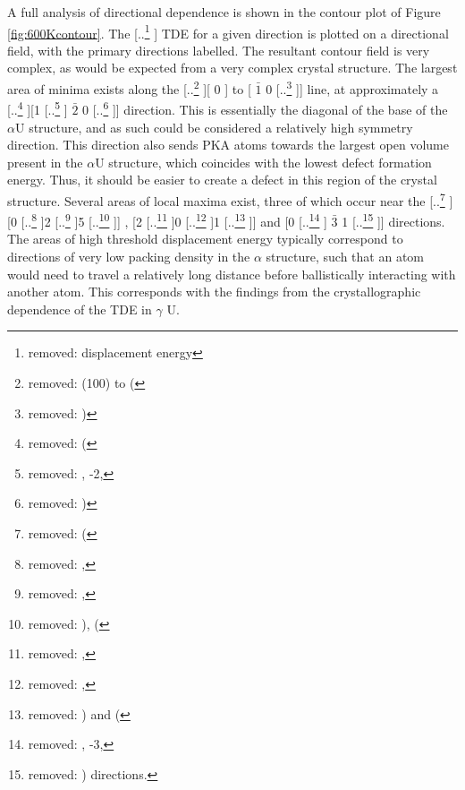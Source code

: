 \documentclass[review]{elsarticle}
\providecommand{\DIFaddtex}[1]{{\protect\color{blue} \sf #1}} %
\providecommand{\DIFdeltex}[1]{{\protect\color{red} [..\footnote{removed: #1} ]}} %
\providecommand{\DIFaddbegin}{} %
\providecommand{\DIFaddend}{} %
\providecommand{\DIFdelbegin}{} %
\providecommand{\DIFdelend}{} %
\providecommand{\DIFadd}[1]{\texorpdfstring{\DIFaddtex{#1}}{#1}} %
\providecommand{\DIFdel}[1]{\texorpdfstring{\DIFdeltex{#1}}{}} %
\newcommand{\DIFscaledelfig}{0.5}
\newlength{\DIFdelgraphicswidth} %
\newlength{\DIFdelgraphicsheight} %
\newcommand{\DIFaddincludegraphics}[2][]{{\color{blue}\fbox{\DIFOincludegraphics[#1]{#2}}}} %
\newcommand{\DIFdelincludegraphics}[2][]{%
\sbox{\DIFdelgraphicsbox}{\DIFOincludegraphics[#1]{#2}}%
\settoboxwidth{\DIFdelgraphicswidth}{\DIFdelgraphicsbox} %
\settoboxtotalheight{\DIFdelgraphicsheight}{\DIFdelgraphicsbox} %
\scalebox{\DIFscaledelfig}{%
\parbox[b]{\DIFdelgraphicswidth}{\usebox{\DIFdelgraphicsbox}\\[-\baselineskip] \rule{\DIFdelgraphicswidth}{0em}}\llap{\resizebox{\DIFdelgraphicswidth}{\DIFdelgraphicsheight}{%
\setlength{\unitlength}{\DIFdelgraphicswidth}%
\begin{picture}(1,1)%
\thicklines\linethickness{2pt} %
{\color[rgb]{1,0,0}\put(0,0){\framebox(1,1){}}}%
{\color[rgb]{1,0,0}\put(0,0){\line( 1,1){1}}}%
{\color[rgb]{1,0,0}\put(0,1){\line(1,-1){1}}}%
\end{picture}%
}\hspace*{3pt}}} %
} %
\DeclareRobustCommand{\DIFaddbegin}{\DIFOaddbegin \let\includegraphics\DIFaddincludegraphics} %
\DeclareRobustCommand{\DIFaddend}{\DIFOaddend \let\includegraphics\DIFOincludegraphics} %
\DeclareRobustCommand{\DIFdelbegin}{\DIFOdelbegin \let\includegraphics\DIFdelincludegraphics} %
\DeclareRobustCommand{\DIFdelend}{\DIFOaddend \let\includegraphics\DIFOincludegraphics} %
\begin{document}
A full analysis of directional dependence is shown in the contour plot of Figure \ref{fig:600Kcontour}. The \DIFdelbegin \DIFdel{displacement energy }\DIFdelend \DIFaddbegin \DIFadd{TDE }\DIFaddend for a given direction is plotted on a directional field, with the primary directions labelled. The resultant contour field is very complex, as would be expected from a very complex crystal structure. The largest area of minima exists along the \DIFdelbegin \DIFdel{(100) to (}\DIFdelend \DIFaddbegin [\DIFadd{1 }\DIFaddend 0 \DIFaddbegin \DIFadd{0}] \DIFadd{to }[\DIFadd{0 }\DIFaddend $\bar{1}$ 0\DIFdelbegin \DIFdel{) }\DIFdelend \DIFaddbegin ] \DIFaddend line, at approximately a \DIFdelbegin \DIFdel{(}\DIFdelend \DIFaddbegin [\DIFaddend 1 \DIFdelbegin \DIFdel{, -2, }\DIFdelend \DIFaddbegin \DIFadd{$\bar{2}$ }\DIFaddend 0\DIFdelbegin \DIFdel{) }\DIFdelend \DIFaddbegin ] \DIFaddend direction. This is essentially the diagonal of the base of the $\alpha$U structure, and as such could be considered a relatively high symmetry direction. \DIFaddbegin \DIFadd{This direction also sends PKA atoms towards the largest open volume present in the $\alpha$U structure, which coincides with the lowest defect formation energy. Thus, it should be easier to create a defect in this region of the crystal structure. }\DIFaddend Several areas of local maxima exist, three of which occur near the \DIFdelbegin \DIFdel{(}\DIFdelend \DIFaddbegin [\DIFaddend 0 \DIFdelbegin \DIFdel{, }\DIFdelend 2 \DIFdelbegin \DIFdel{, }\DIFdelend 5\DIFdelbegin \DIFdel{), (}\DIFdelend \DIFaddbegin ]\DIFadd{, }[\DIFaddend 2 \DIFdelbegin \DIFdel{, }\DIFdelend 0 \DIFdelbegin \DIFdel{, }\DIFdelend 1\DIFdelbegin \DIFdel{) and (}\DIFdelend \DIFaddbegin ] \DIFadd{and }[\DIFaddend 0 \DIFdelbegin \DIFdel{, -3, }\DIFdelend \DIFaddbegin \DIFadd{$\bar{3}$ }\DIFaddend 1\DIFdelbegin \DIFdel{) directions. }\DIFdelend \DIFaddbegin ] \DIFadd{directions. The areas of high threshold displacement energy typically correspond to directions of very low packing density in the $\alpha$ structure, such that an atom would need to travel a relatively long distance before ballistically interacting with another atom. This corresponds with the findings from the crystallographic dependence of the TDE in $\gamma$ U. 
}\DIFaddend 
\end{document}
